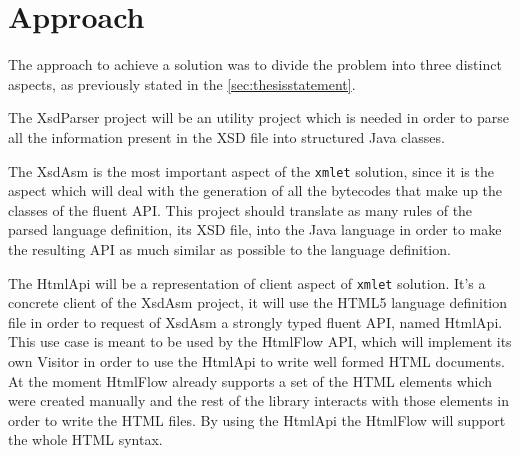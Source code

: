 \section{Approach}
\label{sec:approach}

The approach to achieve a solution was to divide the problem into three distinct aspects, as previously stated in the \ref{sec:thesisstatement}. 

\noindent
The XsdParser project will be an utility project which is needed in order to parse all the information present in the \ac{XSD} file into structured Java classes. 

\noindent
The XsdAsm is the most important aspect of the \texttt{xmlet} solution, since it is the aspect which will deal with the generation of all the bytecodes that make up the classes of the fluent \ac{API}. This project should translate as many rules of the parsed language definition, its \ac{XSD} file, into the Java language in order to make the resulting \ac{API} as much similar as possible to the language definition.

\noindent
The HtmlApi will be a representation of client aspect of \texttt{xmlet} solution. It's a concrete client of the XsdAsm project, it will use the \ac{HTML}5 language definition file in order to request of XsdAsm a strongly typed fluent \ac{API}, named HtmlApi. This use case is meant to be used by the HtmlFlow \ac{API}, which will implement its own Visitor in order to use the HtmlApi to write well formed \ac{HTML} documents. At the moment HtmlFlow already supports a set of the \ac{HTML} elements which were created manually and the rest of the library interacts with those elements in order to write the \ac{HTML} files. By using the HtmlApi the HtmlFlow will support the whole \ac{HTML} syntax. 